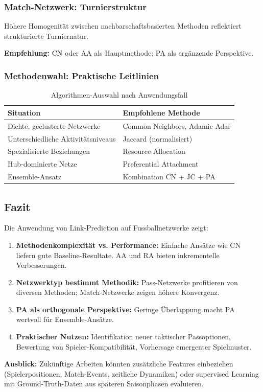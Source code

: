 \subsubsection{Match-Netzwerk: Turnierstruktur}

Höhere Homogenität zwischen nachbarschaftsbasierten Methoden reflektiert strukturierte Turniernatur.

\textbf{Empfehlung:} CN oder AA als Hauptmethode; PA als ergänzende Perspektive.

\subsubsection{Methodenwahl: Praktische Leitlinien}

\begin{table}[H]
\centering
\caption{Algorithmen-Auswahl nach Anwendungsfall}
\label{tab:le8_method_choice}
\begin{tabular}{ll}
\toprule
\textbf{Situation} & \textbf{Empfohlene Methode} \\
\midrule
Dichte, geclusterte Netzwerke & Common Neighbors, Adamic-Adar \\
Unterschiedliche Aktivitätsniveaus & Jaccard (normalisiert) \\
Spezialisierte Beziehungen & Resource Allocation \\
Hub-dominierte Netze & Preferential Attachment \\
Ensemble-Ansatz & Kombination CN + JC + PA \\
\bottomrule
\end{tabular}
\end{table}

\subsection{Fazit}

Die Anwendung von Link-Prediction auf Fussballnetzwerke zeigt:

\begin{enumerate}
  \item \textbf{Methodenkomplexität vs. Performance:} Einfache Ansätze wie CN liefern gute Baseline-Resultate. AA und RA bieten inkrementelle Verbesserungen.
  \item \textbf{Netzwerktyp bestimmt Methodik:} Pass-Netzwerke profitieren von diversen Methoden; Match-Netzwerke zeigen höhere Konvergenz.
  \item \textbf{PA als orthogonale Perspektive:} Geringe Überlappung macht PA wertvoll für Ensemble-Ansätze.
  \item \textbf{Praktischer Nutzen:} Identifikation neuer taktischer Passoptionen, Bewertung von Spieler-Kompatibilität, Vorhersage emergenter Spielmuster.
\end{enumerate}

\textbf{Ausblick:} Zukünftige Arbeiten könnten zusätzliche Features einbeziehen (Spielerpositionen, Match-Events, zeitliche Dynamiken) oder supervised Learning mit Ground-Truth-Daten aus späteren Saisonphasen evaluieren.
